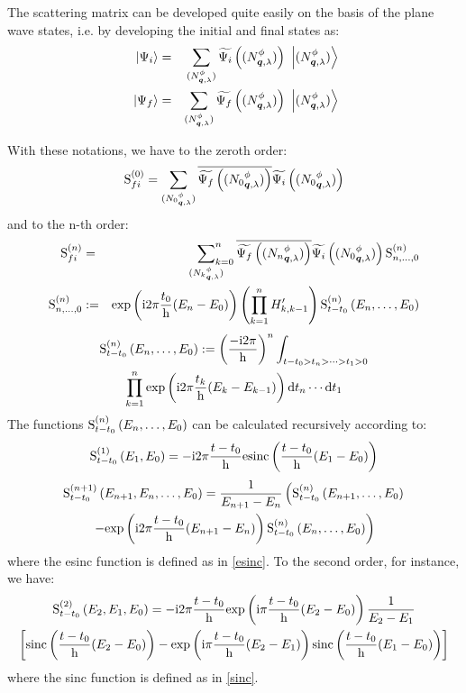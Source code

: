 \documentclass[10pt,a4paper,twoside,openany]{book}
\begin{document}
The scattering matrix can be developed quite easily on the basis of the plane wave states, i.e. by developing the initial and final states as:
\begin{eqnarray*}
\ \left|{\Psi_i}\right\rangle & = & \sum_{({N}^{\phi}_{{\boldsymbol{q}}, {\lambda}})} \widetilde{\Psi_i} \left( ({N}^{\phi}_{{\boldsymbol{q}}, {\lambda}}) \right) \ \left|{({N}^{\phi}_{{\boldsymbol{q}}, {\lambda}})}\right\rangle \\
\ \left|{\Psi_f}\right\rangle & = & \sum_{({N}^{\phi}_{{\boldsymbol{q}}, {\lambda}})} \widetilde{\Psi_f} \left( ({N}^{\phi}_{{\boldsymbol{q}}, {\lambda}}) \right) \ \left|{({N}^{\phi}_{{\boldsymbol{q}}, {\lambda}})}\right\rangle
\end{eqnarray*}

With these notations, we have to the zeroth order:
\begin{equation*}
\mathrm S_{{f}{i}}^{({0})} = \sum_{({N_0}^{\phi}_{{\boldsymbol{q}}, {\lambda}})} \overline{\widetilde{\Psi_f} \left( ({N_0}^{\phi}_{{\boldsymbol{q}}, {\lambda}}) \right) } \widetilde{\Psi_i} \left( ({N_0}^{\phi}_{{\boldsymbol{q}}, {\lambda}}) \right)
\end{equation*}
and to the n-th order:
\begin{eqnarray*}
\mathrm S_{{f}{i}}^{({n})} & = & \sideset{}{_{k=0}^n}\sum_{({N_k}^{\phi}_{{\boldsymbol{q}}, {\lambda}})} \overline{\widetilde{\Psi_f} \left( ({N_n}^{\phi}_{{\boldsymbol{q}}, {\lambda}}) \right) } \widetilde{\Psi_i} \left( ({N_0}^{\phi}_{{\boldsymbol{q}}, {\lambda}}) \right) \mathrm S^{(n)}_{n,\dotsc,0} \\
\mathrm S^{(n)}_{n,\dotsc,0} & := & \mathrm{exp} \left( {\mathrm{i} 2 \pi \frac{t_0} {\mathrm h} ( E_n - E_0 )} \right) \left( \prod_{k=1}^n H'_{k,k-1} \right) \mathrm S^{(n)}_{t - t_0}\left({E_n, \dotsc, E_0}\right)
\end{eqnarray*}
\begin{multline*}
\mathrm S^{(n)}_{t - t_0}\left({E_n, \dotsc, E_0}\right) := \left( \frac{-\mathrm{i} 2 \pi} {\mathrm h} \right)^n \int_{t - t_0 > t_n > \dotsb > t_1 > 0} \\
\prod_{k=1}^n \mathrm{exp} \left( {\mathrm{i} 2 \pi \frac{t_k} {\mathrm h} ( E_k - E_{k - 1} )} \right) \mathrm dt_n \dotsm \mathrm dt_1
\end{multline*}
The functions $\mathrm S^{(n)}_{t - t_0}\left({E_n, \dotsc, E_0}\right)$ can be calculated recursively according to:
\begin{equation*}
\mathrm S^{(1)}_{t - t_0}\left({E_1, E_0}\right) = -\mathrm{i} 2 \pi \frac{t - t_0} {\mathrm h} \mathrm{esinc} \left( {\frac{t - t_0} {\mathrm h} ( E_1 - E_0 )} \right)
\end{equation*}
\begin{multline*}
\mathrm S^{(n + 1)}_{t - t_0}\left({E_{n + 1}, E_n, \dotsc, E_0}\right) = \frac 1 {E_{n + 1} - E_n} \left( \mathrm S^{(n)}_{t - t_0}\left({E_{n + 1}, \dotsc, E_0}\right) \right. \\
\left. - \mathrm{exp} \left( {\mathrm{i} 2 \pi \frac{t - t_0} {\mathrm h} ( E_{n + 1} - E_n )} \right) \mathrm S^{(n)}_{t - t_0}\left({E_n, \dotsc, E_0}\right) \right)
\end{multline*}
where the esinc function is defined as in \ref{esinc}. To the second order, for instance, we have:
\begin{multline*}
\mathrm S^{(2)}_{t - t_0}\left({E_2, E_1, E_0}\right) = -\mathrm{i} 2 \pi \frac{t - t_0} {\mathrm h} \mathrm{exp} \left( {\mathrm{i} \pi \frac{t - t_0} {\mathrm h} ( E_2 - E_0 )} \right) \frac 1 {E_2 - E_1} \\
\left[ \mathrm{sinc} \left( {\frac{t - t_0} {\mathrm h} ( E_2 - E_0 )} \right) - \mathrm{exp} \left( {\mathrm{i} \pi \frac{t - t_0} {\mathrm h} ( E_2 - E_1 )} \right) \mathrm{sinc} \left( {\frac{t - t_0} {\mathrm h} ( E_1 - E_0 )} \right) \right]
\end{multline*}
where the sinc function is defined as in \ref{sinc}.
\end{document}
